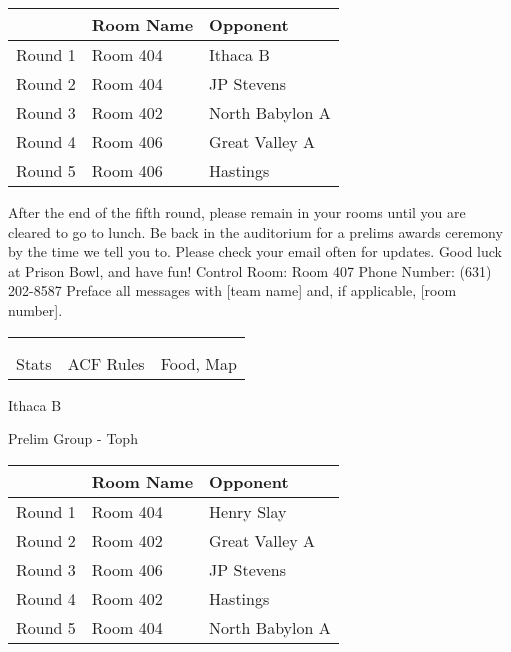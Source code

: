 \documentclass{article}%
\begin{document}
\vspace*{4pt}%
\begin{tabularx}{\textwidth}{|c|Y|Y|}%
\hline%
&Room Name&Opponent\\%
\hline%
Round 1&Room 404&Ithaca B\\%
Round 2&Room 404&JP Stevens\\%
Round 3&Room 402&North Babylon A\\%
Round 4&Room 406&Great Valley A\\%
Round 5&Room 406&Hastings\\%
\hline%
\end{tabularx}%
\vspace*{30pt}%
\linebreak%
After the end of the fifth round, please remain in your rooms until you are cleared to go to lunch. Be back in the auditorium for a prelims awards ceremony by the time we tell you to. Please check your email often for updates. Good luck at Prison Bowl, and have fun!\newline%
\newline%
Control Room: Room 407\newline%
Phone Number: (631) 202{-}8587\newline%
Preface all messages with {[}team name{]} and, if applicable, {[}room number{]}.%
\vspace*{30pt}%
\newline%
%
\begin{tabularx}{\textwidth}{YYY}%
  &  &  \\%
\\%
Stats&ACF Rules&Food, Map\\%
\end{tabularx}%
\newpage%
%
\begin{center}%
\begin{Huge}%
Ithaca B%
\end{Huge}%
\vspace*{12pt}%
\linebreak%
\begin{Large}%
Prelim Group {-} Toph%
\end{Large}%
\end{center}%
\vspace*{4pt}%
\begin{tabularx}{\textwidth}{|c|Y|Y|}%
\hline%
&Room Name&Opponent\\%
\hline%
Round 1&Room 404&Henry Slay\\%
Round 2&Room 402&Great Valley A\\%
Round 3&Room 406&JP Stevens\\%
Round 4&Room 402&Hastings\\%
Round 5&Room 404&North Babylon A\\%
\hline%
\end{tabularx}%
\end{document}
